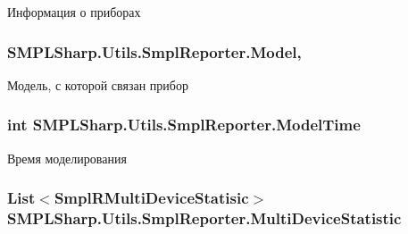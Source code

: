 Информация о приборах 

\hypertarget{class_s_m_p_l_sharp_1_1_utils_1_1_smpl_reporter_af01db9140661991e99d6978c250ff4c1}{
\subsubsection[{Model}]{ S\-M\-P\-L\-Sharp.\-Utils.\-Smpl\-Reporter.\-Model\hspace{0.3cm}{\ttfamily [get]}, {\ttfamily [set]}}}\label{d2/d18/class_s_m_p_l_sharp_1_1_utils_1_1_smpl_reporter_af01db9140661991e99d6978c250ff4c1}


Модель, с которой связан прибор 

\hypertarget{class_s_m_p_l_sharp_1_1_utils_1_1_smpl_reporter_a0115cc791c67a57ba79083c12d4f163b}{
\subsubsection[{Model\-Time}]{\setlength{\rightskip}{0pt plus 5cm}int S\-M\-P\-L\-Sharp.\-Utils.\-Smpl\-Reporter.\-Model\-Time\hspace{0.3cm}{\ttfamily [get]}}}\label{d2/d18/class_s_m_p_l_sharp_1_1_utils_1_1_smpl_reporter_a0115cc791c67a57ba79083c12d4f163b}


Время моделирования 

\hypertarget{class_s_m_p_l_sharp_1_1_utils_1_1_smpl_reporter_abef5661d7d82934362ad8504796b31af}{
\subsubsection[{Multi\-Device\-Statistic}]{\setlength{\rightskip}{0pt plus 5cm}List$<${\bf Smpl\-R\-Multi\-Device\-Statisic}$>$ S\-M\-P\-L\-Sharp.\-Utils.\-Smpl\-Reporter.\-Multi\-Device\-Statistic\hspace{0.3cm}{\ttfamily [get]}}}\label{d2/d18/class_s_m_p_l_sharp_1_1_utils_1_1_smpl_reporter_abef5661d7d82934362ad8504796b31af}



